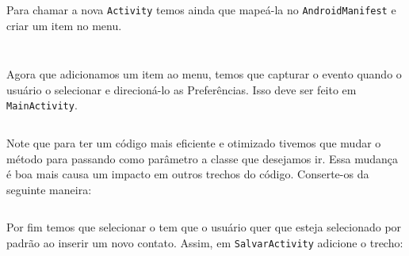 \begin{listing}[H]
  \inputminted[linenos=true,frame=bottomline,tabsize=3]{ java }{ source/EditarPreferencias-1.java }
  \caption{Activity para mostrar preferências [EditarPreferencias.java]}
\end{listing}

Para chamar a nova \texttt{Activity} temos ainda que mapeá-la no \texttt{AndroidManifest} e criar
um item no menu.

\begin{listing}[H]
  \inputminted[linenos=true,frame=bottomline,tabsize=3]{ xml }{ source/AndroidManifest-4.xml }
  \caption{Mapeando Activity EditarPreferencias [AndroidManifest.xml]}
\end{listing}

\begin{listing}[H]
  \inputminted[linenos=true,frame=bottomline,tabsize=3]{ xml }{ source/main_menu-2.xml }
  \caption{Adicionar item Preferências ao menu principal [res/menu/main\b{ }menu.xml]}
\end{listing}

Agora que adicionamos um item ao menu, temos que capturar o evento quando o usuário o selecionar
e direcioná-lo as Preferências. Isso deve ser feito em \texttt{MainActivity}.

\begin{listing}[H]
  \inputminted[linenos=true,frame=bottomline,tabsize=3]{ java }{ source/MainActivity-12.java }
  \caption{Ir para Preferências pelo menu principal [MainActivity.java]}
\end{listing}

Note que para ter um código mais eficiente e otimizado tivemos que mudar o método 
para  passando como parâmetro a classe que desejamos ir. Essa mudança é boa mais causa
um impacto em outros trechos do código. Conserte-os da seguinte maneira:

\begin{listing}[H]
  \inputminted[linenos=true,frame=bottomline,tabsize=3]{ java }{ source/MainActivity-13.java }
  \caption{Mudança em método irParaSalvar [MainActivity.java]}
\end{listing}

Por fim temos que selecionar o tem que o usuário quer que esteja selecionado por padrão ao inserir
um novo contato. Assim, em \texttt{SalvarActivity} adicione o trecho:

